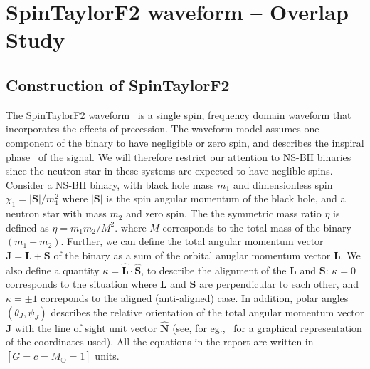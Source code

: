 \chapter{SpinTaylorF2 waveform -- Overlap Study} 

\label{chap:SpinTaylorF2} 
\section{Construction of SpinTaylorF2} 
The SpinTaylorF2 waveform~\cite{Lundgren2014} is a single spin, frequency domain
waveform that incorporates the effects of precession.  The waveform model
assumes one component of the binary to have negligible or zero spin, and
describes the inspiral phase~\cite{Event_0} of the signal. We will therefore
restrict our attention to NS-BH binaries since the neutron star in these systems
are expected to have neglible spins. Consider a NS-BH binary, with black hole
mass $m_{1}$ and dimensionless spin $\chi_{1} = |\mathbf{S}|/m_{1}^2$ where
$|\mathbf{S}|$ is the spin angular momentum of the black hole, and a neutron
star with mass $m_{2}$ and zero spin. The the symmetric mass ratio $\eta$ is
defined as $\eta=m_{1}m_{2}/M^2$. where $M$ corresponds to the total mass of the
binary $(m_{1} + m_{2})$.  Further, we can define the total angular momentum
vector $\mathbf{J}=\mathbf{L} + \mathbf{S}$ of the binary as a sum of the
orbital anuglar momentum vector $\mathbf{L}$. We also define a quantity
$\kappa=\hat{\mathbf{L}}\cdot\hat{\mathbf{S}}$, to describe the alignment of the
$\mathbf{L}$ and $\mathbf{S}$: $\kappa=0$ corresponds to the situation where
$\mathbf{L}$ and $\mathbf{S}$ are perpendicular to each other, and $\kappa=\pm
1$ correponds to the aligned (anti-aligned) case. In addition, polar angles
$(\theta_{J}, \psi_{J})$  describes the relative orientation  of the total
angular momentum vector $\mathbf{J}$ with the line of sight unit vector
$\hat{\mathbf{N}}$ (see, for eg.,~\cite{thetaJ} for a graphical representation
of the coordinates used). All the equations in the report are written in 
$\left[G = c = M_{\odot }= 1\right]$ units.

